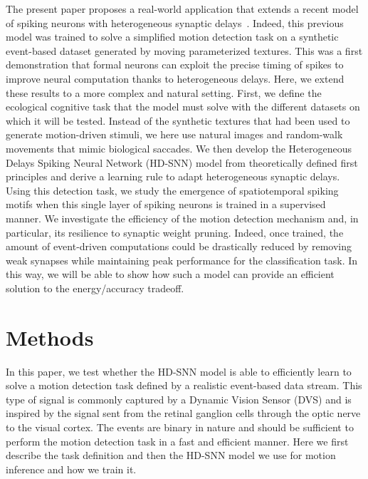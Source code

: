 \documentclass[default]{sn-jnl}%
\theoremstyle{thmstyleone}%
\theoremstyle{thmstyletwo}%
\theoremstyle{thmstylethree}%
\begin{document}
The present paper proposes a real-world application that extends a recent model of spiking neurons with heterogeneous synaptic delays~\cite{grimaldi_learning_2022}. Indeed, this previous model was trained to solve a simplified motion detection task on a synthetic event-based dataset generated by moving parameterized textures. This was a first demonstration that formal neurons can exploit the precise timing of spikes to improve neural computation thanks to heterogeneous delays. Here, we extend these results to a more complex and natural setting. First, we define the ecological cognitive task that the model must solve with the different datasets on which it will be tested. Instead of the synthetic textures that had been used to generate motion-driven stimuli, we here use natural images and random-walk movements that mimic biological saccades. We then develop the Heterogeneous Delays Spiking Neural Network (HD-SNN) model from theoretically defined first principles and derive a learning rule to adapt heterogeneous synaptic delays. Using this detection task, we study the emergence of spatiotemporal spiking motifs when this single layer of spiking neurons is trained in a supervised manner. We investigate the efficiency of the motion detection mechanism and, in particular, its resilience to synaptic weight pruning. Indeed, once trained, the amount of event-driven computations could be drastically reduced by removing weak synapses while maintaining peak performance for the classification task. In this way, we will be able to show how such a model can provide an efficient solution to the energy/accuracy tradeoff.
%
\section{Methods}
\label{sec:methods}
In this paper, we test whether the HD-SNN model is able to efficiently learn to solve a motion detection task defined by a realistic event-based data stream. This type of signal is commonly captured by a Dynamic Vision Sensor (DVS) and is inspired by the signal sent from the retinal ganglion cells through the optic nerve to the visual cortex. The events are binary in nature and should be sufficient to perform the motion detection task in a fast and efficient manner. Here we first describe the task definition and then the HD-SNN model we use for motion inference and how we train it.
%
\end{document}
